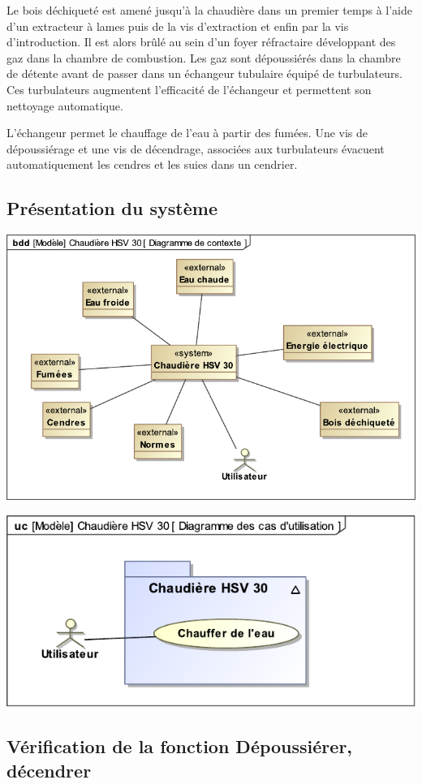 Le bois déchiqueté est amené jusqu'à la chaudière dans un premier temps à l'aide d'un extracteur à lames puis de la vis d'extraction et enfin par la vis d'introduction. Il est alors brûlé au sein d'un foyer réfractaire développant des gaz dans la chambre de combustion. Les gaz sont dépoussiérés dans la chambre de détente avant de passer dans un échangeur tubulaire équipé de turbulateurs. Ces turbulateurs augmentent l'efficacité de l'échangeur et permettent son nettoyage automatique.

L'échangeur permet le chauffage de l'eau à partir des fumées. Une vis de dépoussiérage et une vis de décendrage, associées aux turbulateurs évacuent automatiquement les cendres et les suies dans un cendrier.

\subsection{Présentation du système}

\begin{center}
	\includegraphics[width=0.8\linewidth]{img/Chaudiere_Contexte}

	\includegraphics[width=0.6\linewidth]{img/Chaudiere_Cas_utilisation}
\end{center}

\subsection{Vérification de la fonction \og Dépoussiérer, décendrer \fg}

